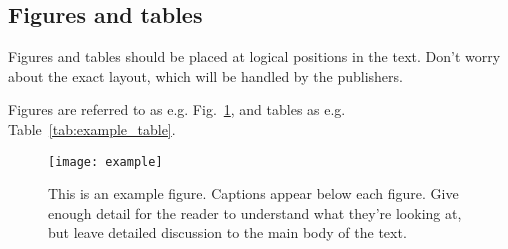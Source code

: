 \documentclass[a4paper,fleqn,usenatbib]{mnras}
\begin{document}
\subsection{Figures and tables}

Figures and tables should be placed at logical positions in the text. Don't
worry about the exact layout, which will be handled by the publishers.

Figures are referred to as e.g. Fig.~\ref{fig:example_figure}, and tables as
e.g. Table~\ref{tab:example_table}.

\begin{figure}
	\texttt{[image: example]}
    \caption{This is an example figure. Captions appear below each figure.
	Give enough detail for the reader to understand what they're looking at,
	but leave detailed discussion to the main body of the text.}
    \label{fig:example_figure}
\end{figure}

\end{document}
